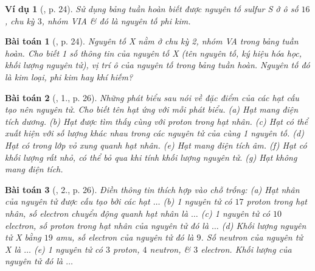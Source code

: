\documentclass{article}
\newtheorem{baitoan}{Bài toán}
\newtheorem{vidu}{Ví dụ}
\begin{document}
\begin{vidu}[\cite{SGK_KHTN_7_Canh_Dieu}, p. 24]
	Sử dụng bảng tuần hoàn biết được nguyên tố sulfur \emph{S} ở ô số $16$, chu kỳ $3$, nhóm VIA \& đó là nguyên tố phi kim.
\end{vidu}

\begin{baitoan}[\cite{SGK_KHTN_7_Canh_Dieu}, p. 24]
	Nguyên tố X nằm ở chu kỳ 2, nhóm VA trong bảng tuần hoàn. Cho biết 1 số thông tin của nguyên tố X (tên nguyên tố, ký hiệu hóa học, khối lượng nguyên tử), vị trí ô của nguyên tố trong bảng tuần hoàn. Nguyên tố đó là kim loại, phi kim hay khí hiếm?
\end{baitoan}

\noindent{}

\begin{baitoan}[\cite{SGK_KHTN_7_Canh_Dieu}, 1., p. 26]
	Những phát biểu sau nói về đặc điểm của các hạt cấu tạo nên nguyên tử. Cho biết tên hạt ứng với mỗi phát biểu. (a) Hạt mang điện tích dương. (b) Hạt được tìm thấy cùng với proton trong hạt nhân. (c) Hạt có thể xuất hiện với số lượng khác nhau trong các nguyên tử của cùng 1 nguyên tố. (d) Hạt có trong lớp vỏ xung quanh hạt nhân. (e) Hạt mang điện tích âm. (f) Hạt có khối lượng rất nhỏ, có thể bỏ qua khi tính khối lượng nguyên tử. (g) Hạt không mang điện tích.
\end{baitoan}

\begin{baitoan}[\cite{SGK_KHTN_7_Canh_Dieu}, 2., p. 26]
	Điền thông tin thích hợp vào chỗ trống: (a) Hạt nhân của nguyên tử được cấu tạo bởi các hạt $\ldots$ (b) 1 nguyên tử có $17$ proton trong hạt nhân, số electron chuyển động quanh hạt nhân là $\ldots$ (c) 1 nguyên tử có $10$ electron, số proton trong hạt nhân của nguyên tử đó là $\ldots$ (d) Khối lượng nguyên tử X bằng $19$ amu, số electron của nguyên tử đó là $9$. Số neutron của nguyên tử X là $\ldots$ (e) 1 nguyên tử có $3$ proton, $4$ neutron, \& $3$ electron. Khối lượng của nguyên tử đó là $\ldots$
\end{baitoan}
\end{document}
